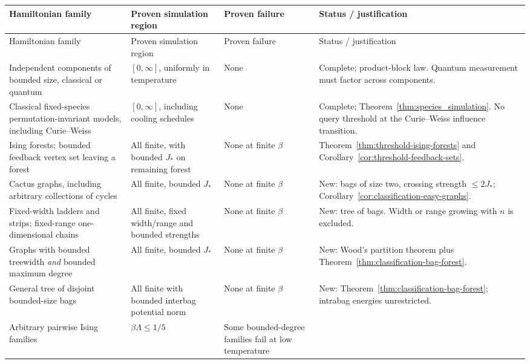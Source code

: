 \begingroup\small
\begin{longtable}{@{}>{\raggedright\arraybackslash}p{}>{\raggedright\arraybackslash}p{}>{\raggedright\arraybackslash}p{}>{\raggedright\arraybackslash}p{}@{}}
\toprule
Hamiltonian family & Proven simulation region & Proven failure & Status / justification\\
\midrule
\endfirsthead
\toprule
Hamiltonian family & Proven simulation region & Proven failure & Status / justification\\
\midrule
\endhead
\bottomrule
\endfoot
Independent components of bounded size, classical or quantum &
$[0,\infty]$, uniformly in temperature & None &
Complete; product-block law. Quantum measurement must factor across components.\\
\addlinespace
Classical fixed-species permutation-invariant models, including Curie--Weiss &
$[0,\infty]$, including cooling schedules & None &
Complete; Theorem~\ref{thm:species_simulation}. No query threshold at the Curie--Weiss influence transition.\\
\addlinespace
Ising forests; bounded feedback vertex set leaving a forest &
All finite, with bounded $J_*$ on remaining forest & None at finite $\beta$ &
Theorem~\ref{thm:threshold-ising-forests} and Corollary~\ref{cor:threshold-feedback-sets}.\\
\addlinespace
Cactus graphs, including arbitrary collections of cycles &
All finite, bounded $J_*$ & None at finite $\beta$ &
New: bags of size two, crossing strength $\le2J_*$; Corollary~\ref{cor:classification-easy-graphs}.\\
\addlinespace
Fixed-width ladders and strips; fixed-range one-dimensional chains &
All finite, fixed width/range and bounded strengths & None at finite $\beta$ &
New: tree of bags. Width or range growing with $n$ is excluded.\\
\addlinespace
Graphs with bounded treewidth \emph{and} bounded maximum degree &
All finite, bounded $J_*$ & None at finite $\beta$ &
New: Wood's partition theorem plus Theorem~\ref{thm:classification-bag-forest}.\\
\addlinespace
General tree of disjoint bounded-size bags &
All finite with bounded interbag potential norm & None at finite $\beta$ &
New: Theorem~\ref{thm:classification-bag-forest}; intrabag energies unrestricted.\\
\addlinespace
Arbitrary pairwise Ising families &
$\beta\Lambda\le1/5$ & Some bounded-degree families fail at low temperature &

\end{longtable}
